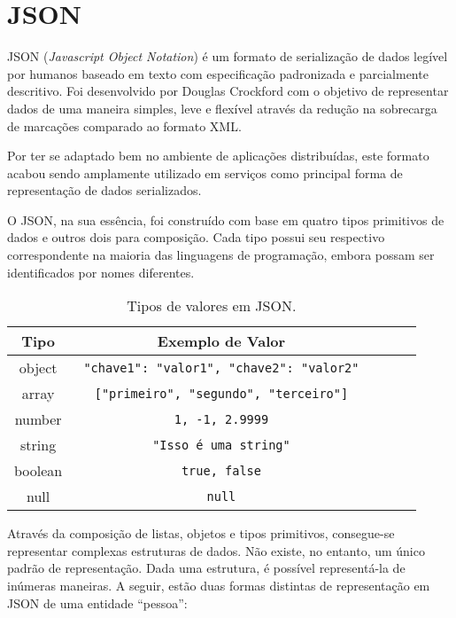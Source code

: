 \section{JSON}

JSON (\textit{Javascript Object Notation}) é um formato de serialização de dados legível por humanos baseado em texto com especificação padronizada e parcialmente descritivo. Foi desenvolvido por Douglas Crockford com o objetivo de representar dados de uma maneira simples, leve e flexível através da redução na sobrecarga de marcações comparado ao formato XML.

Por ter se adaptado bem no ambiente de aplicações distribuídas, este formato acabou sendo amplamente utilizado em serviços como principal forma de representação de dados serializados. \cite{Duvander2013}

O JSON, na sua essência, foi construído com base em quatro tipos primitivos de dados e outros dois para composição. Cada tipo possui seu respectivo correspondente na maioria das linguagens de programação, embora possam ser identificados por nomes diferentes. \cite{Droettboom2015}

\begin{table}[H]
  \centering
  \begin{tabular}{|c|c|c|c|c|}
    \hline
    Tipo & Exemplo de Valor \\
    \hline
    object & \texttt{ {"chave1": "valor1", "chave2": "valor2"} } \\
    \hline
    array & \texttt{ ["primeiro", "segundo", "terceiro"] } \\
    \hline
    number & \texttt{ 1, -1, 2.9999 } \\
    \hline
    string & \texttt{ "Isso é uma string" } \\
    \hline
    boolean & \texttt{ true, false } \\
    \hline
    null & \texttt{ null } \\
    \hline
  \end{tabular}
  \caption{Tipos de valores em JSON.}
\end{table}

Através da composição de listas, objetos e tipos primitivos, consegue-se representar complexas estruturas de dados. Não existe, no entanto, um único padrão de representação. Dada uma estrutura, é possível representá-la de inúmeras maneiras. A seguir, estão duas formas distintas de representação em JSON de uma entidade “pessoa”:
 \cite{Droettboom2015}

